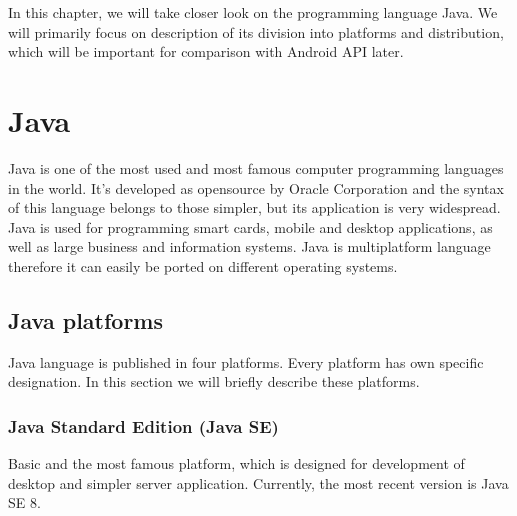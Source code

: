 In this chapter, we will take closer look on the programming language Java. We will primarily focus on description of its division into platforms and distribution, which will be important for comparison with Android API later. 

\section{Java}
Java \cite{JavaBook} is one of the most used and most famous computer programming languages in the world. It's developed as opensource by Oracle Corporation and the syntax of this language belongs to those simpler, but its application is very widespread. Java is used for programming smart cards, mobile and desktop applications, as well as large business and information systems. Java is multiplatform language therefore it can easily be ported on different operating systems.  

\subsection{Java platforms}
Java language is published in four platforms. Every platform has own specific designation. In this section we will briefly describe these platforms.

\subsubsection{Java Standard Edition (Java SE)}
Basic and the most famous platform, which is designed for development of desktop and simpler server application. Currently, the most recent version is Java SE 8.

